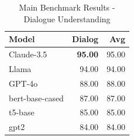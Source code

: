 \begin{table}[htbp]
\centering
\caption{Main Benchmark Results - Dialogue Understanding}
\label{tab:dialogue_main_results}
\begin{tabular}{lrr}
\toprule
Model & Dialog & \textbf{Avg} \\
\midrule
Claude-3.5 & \textbf{95.00} & 95.00 \\
Llama & 94.00 & 94.00 \\
GPT-4o & 88.00 & 88.00 \\
bert-base-cased & 87.00 & 87.00 \\
t5-base & 85.00 & 85.00 \\
gpt2 & 84.00 & 84.00 \\
\bottomrule
\end{tabular}
\end{table}
